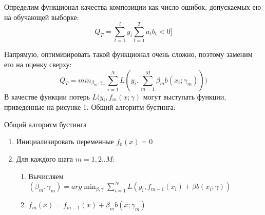 Определим функционал качества композиции как число ошибок, допускаемых
ею на обучающей выборке:
\begin{equation}
	Q_T=\sum_{t=1}^{l} y_i\sum_{t=1}^{T} a_tb_t < 0]
\end{equation}

Напрямую, оптимизировать такой функционал очень сложно, поэтому заменим его на оценку сверху:
\begin{equation}
	Q_T=min_{\beta_m,\gamma_m}\sum_{i=1}^{N}L(y_i,\sum_{m=1}^{M}\beta_m b(x_i;\gamma_m)))
\end{equation}
В качестве функции потерь $L(y_i,f_m(x;\gamma)$ могут выступать функции, приведенные на рисунке 1.
Общий алгоритм бустинга:

\begin{algorithm}
  \caption{Общий алгоритм бустинга}
  \label{overall-boosting-algorithm}
  \begin{enumerate}
  \item Инициализировать переменные $f_0(x)=0$
  \item Для каждого шага $m=1,2 .. M$:
    \begin{enumerate}
      \item Вычисляем $(\beta_m,\gamma_m)=arg \min_{\beta,\gamma} \sum_{i=1}^{N}L(y_i,f_{m-1}(x_i)+\beta b(x_i;\gamma))$
      \item $f_m(x)=f_{m-1}(x)+\beta_m b(x;\gamma_m)$
    \end{enumerate}
  \end{enumerate}
\end{algorithm}



